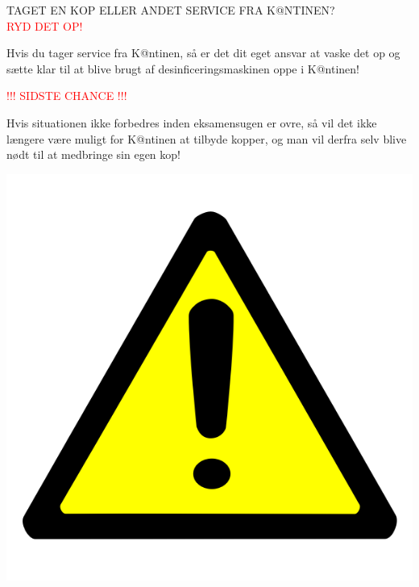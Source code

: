 \documentclass[a4paper]{article}
\begin{document}
  \maketitle
  \begin{center}
  \Huge TAGET EN KOP ELLER ANDET SERVICE FRA K@NTINEN?\\\textcolor{red}{RYD DET OP!}


  \LARGE Hvis du tager service fra K@ntinen, så er det dit eget ansvar at vaske det op og sætte klar til at blive brugt af desinficeringsmaskinen oppe i K@ntinen!
  \end{center}


  \begin{center}
    \Huge \textcolor{red}{!!! SIDSTE CHANCE !!!}


    \LARGE Hvis situationen ikke forbedres inden eksamensugen er ovre, så vil det ikke længere være muligt for K@ntinen at tilbyde kopper, og man vil derfra selv blive nødt til at medbringe sin egen kop!
  \end{center}
  \centering\includegraphics[scale=0.3]{../billeder/attention.png}
  \underskriv
\end{document}
